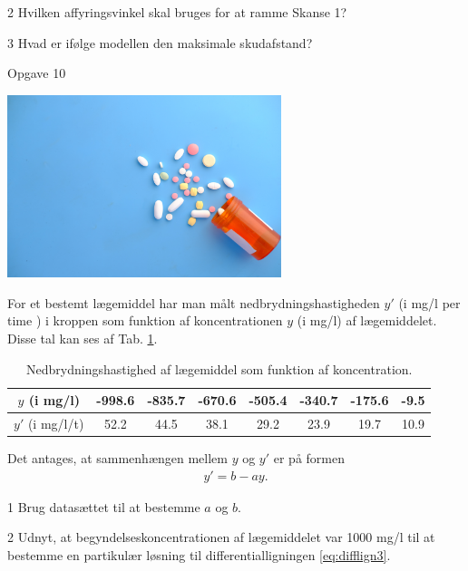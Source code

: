 \begin{delopgave}{}{2}
	Hvilken affyringsvinkel skal bruges for at ramme Skanse 1?
\end{delopgave}
\begin{delopgave}{}{3}
	Hvad er ifølge modellen den maksimale skudafstand?
\end{delopgave}
\begin{opgavetekst}{Opgave 10}
	\begin{center}
		\includegraphics[width=0.6\textwidth]{Billeder/medicin.jpg}
	\end{center}
	For et bestemt lægemiddel har man målt nedbrydningshastigheden $y'$ (i mg/l per time ) i kroppen som funktion af koncentrationen $y$ (i mg/l) af lægemiddelet. Disse tal kan ses af Tab.
	\ref{tab:medicin}.
	\begin{table}[H]
	\centering
	\begin{tabular}{c|c|c|c|c|c|c|c}
		$y$ (i mg/l) & -998.6 & -835.7 & -670.6 & -505.4 & -340.7 & -175.6 & -9.5\\
		\hline
		$y'$ (i mg/l/t) & 52.2 & 44.5 & 38.1 & 29.2 & 23.9 & 19.7 & 10.9
	\end{tabular}
	\caption{Nedbrydningshastighed af lægemiddel som funktion af koncentration.}
	\label{tab:medicin}
	\end{table}
	Det antages, at sammenhængen mellem $y$ og $y'$ er på formen
	\begin{align}\label{eq:difflign3}
		y' = b-ay.
	\end{align}
\end{opgavetekst}
\begin{delopgave}{}{1}
	Brug datasættet til at bestemme $a$ og $b$.
\end{delopgave}
\begin{delopgave}{}{2}
	Udnyt, at begyndelseskoncentrationen af lægemiddelet var 1000 mg/l til at bestemme en partikulær løsning til differentialligningen \eqref{eq:difflign3}. 
\end{delopgave}
